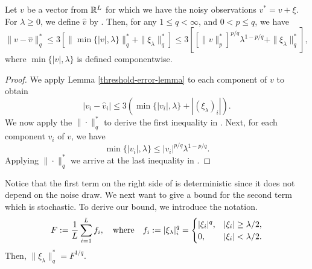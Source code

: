 \begin{theorem}
\label{T;detstoch}
Let  $v$ be a vector from $ \mathbb{R}^L$ for which we have the  noisy observations $v^* = v+ \xi$.  For $\lambda\geq 0$, we  define $\hat v$ by .  Then, for any $1\leq q<\infty$,   and $0<p\leq q$, we have
\begin{equation}\label{Tds}
    \|v - \hat v\|^*_{q} \leq   3   \left [\|\min\{|v|,\lambda\}\|^*_{q}+\|\xi_\lambda\|^*_{q}\right ]\leq 3\left [[\|v\|_p^*]^{p/q}\lambda^{1-p/q}+\|\xi_\lambda\|^*_{q}\right],
\end{equation}
where
 $\min\{|v|,\lambda\}$ is defined componentwise.
  
 
\end{theorem}
\begin{proof}
We apply Lemma \ref{threshold-error-lemma} to each component of $v$ to obtain
\begin{equation}
| v_i-\hat v_i|\le 3(\min\{|v_i|,\lambda\} + |(\xi_\lambda)_i|).
\end{equation}
We now apply the $\|\cdot\|_q^*$ to derive the first inequality in .
Next, for each component $v_i$ of $v$, we have
    \begin{equation}
    \min\{|v_i|,\lambda\}\le  |v_i|^{p/q}\lambda^{1-p/q}.
    \end{equation}
Applying   $\| \cdot\|_q^*$ we arrive at the last inequality in .
\end{proof}

Notice that the first term on the right side of  is deterministic since it does not depend on the noise draw.  We next want to give a bound for the second term which is stochastic. To derive our bound,
we introduce the notation.
\begin{equation}
F:=\frac{1}{L}\sum_{i=1}^L f_i, \quad \hbox{where}\quad     f_i := \left|\xi_{\lambda}\right|^q_i = \begin{cases}
        |\xi_i|^q, & |\xi_i| \geq \lambda / 2,\\
        0, & |\xi_i| < \lambda / 2.
    \end{cases}
\end{equation}  
Then, $\|\xi_\lambda\|^*_q =F^{1/q}$. 

